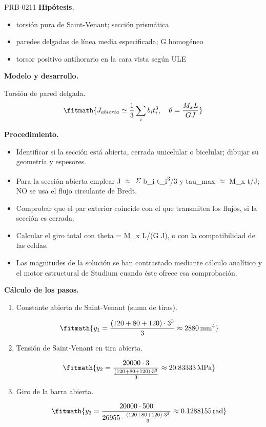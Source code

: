 \begin{studiumworked}{PRB-0211}
\textbf{Hipótesis.}\begin{itemize}\item torsión pura de Saint-Venant; sección prismática
\item paredes delgadas de línea media especificada; G homogéneo
\item torsor positivo antihorario en la cara vista según ULE\end{itemize}

\textbf{Modelo y desarrollo.}

Torsión de pared delgada.\[\fitmath{J_{abierta}\simeq\frac13\sum_i b_i t_i^3,\quad \theta=\frac{M_xL}{GJ}}\]

\textbf{Procedimiento.}\begin{itemize}\item Identificar si la sección está abierta, cerrada unicelular o bicelular; dibujar su geometría y espesores.
\item Para la sección abierta emplear J \ensuremath{\approx} \ensuremath{\Sigma} b\_i t\_i\textsuperscript{3}/3 y tau\_max \ensuremath{\approx} M\_x t/J; NO se usa el flujo circulante de Bredt.
\item Comprobar que el par exterior coincide con el que transmiten los flujos, si la sección es cerrada.
\item Calcular el giro total con theta = M\_x L/(G J), o con la compatibilidad de las celdas.
\item Las magnitudes de la solución se han contrastado mediante cálculo analítico y el motor estructural de Studium cuando éste ofrece esa comprobación.\end{itemize}

\textbf{Cálculo de los pasos.}

\begin{enumerate}

\item Constante abierta de Saint-Venant (suma de tiras).

\[\fitmath{y_{1}=\frac{\left(120+80+120\right)\cdot {3}^{3}}{3}\approx 2880\,\mathrm{mm^{4}}}\]

\item Tensión de Saint-Venant en tira abierta.

\[\fitmath{y_{2}=\frac{20000\cdot 3}{\frac{\left(120+80+120\right)\cdot {3}^{3}}{3}}\approx 20.83333\,\mathrm{MPa}}\]

\item Giro de la barra abierta.

\[\fitmath{y_{3}=\frac{20000\cdot 500}{26955\cdot \frac{\left(120+80+120\right)\cdot {3}^{3}}{3}}\approx 0.1288155\,\mathrm{rad}}\]


\end{enumerate}
\end{studiumworked}
